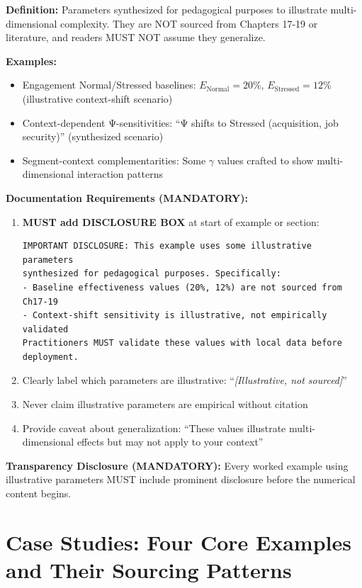 \textbf{Definition:} Parameters synthesized for pedagogical purposes to illustrate multi-dimensional complexity. They are NOT sourced from Chapters 17-19 or literature, and readers MUST NOT assume they generalize.

\textbf{Examples:}
\begin{itemize}[nosep]
\item Engagement Normal/Stressed baselines: $E_{\text{Normal}} = 20\%$, $E_{\text{Stressed}} = 12\%$ (illustrative context-shift scenario)
\item Context-dependent Ψ-sensitivities: ``Ψ shifts to Stressed (acquisition, job security)'' (synthesized scenario)
\item Segment-context complementarities: Some $\gamma$ values crafted to show multi-dimensional interaction patterns
\end{itemize}

\textbf{Documentation Requirements (MANDATORY):}
\begin{enumerate}
\item \textbf{MUST add DISCLOSURE BOX} at start of example or section:
\begin{verbatim}
IMPORTANT DISCLOSURE: This example uses some illustrative parameters
synthesized for pedagogical purposes. Specifically:
- Baseline effectiveness values (20%, 12%) are not sourced from Ch17-19
- Context-shift sensitivity is illustrative, not empirically validated
Practitioners MUST validate these values with local data before deployment.
\end{verbatim}
\item Clearly label which parameters are illustrative: ``\textit{[Illustrative, not sourced]}''
\item Never claim illustrative parameters are empirical without citation
\item Provide caveat about generalization: ``These values illustrate multi-dimensional effects but may not apply to your context''
\end{enumerate}

\textbf{Transparency Disclosure (MANDATORY):} Every worked example using illustrative parameters MUST include prominent disclosure before the numerical content begins.


\section{Case Studies: Four Core Examples and Their Sourcing Patterns}
\label{sec:jjj-casestudies}

